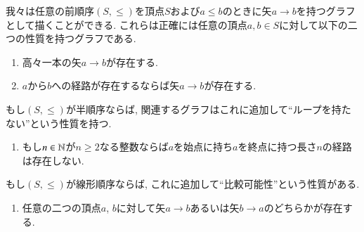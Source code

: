 \begin{remark}\label{rem:preorder to graph}


我々は任意の前順序$(S,\leq)$を頂点$S$および$a\leq b$のときに矢$a\to b$を持つグラフとして描くことができる. これらは正確には任意の頂点$a,b\in S$に対して以下の二つの性質を持つグラフである.
\begin{enumerate}[\hsp 1.]
\item 高々一本の矢$a\to b$が存在する.
\item $a$から$b$への経路が存在するならば矢$a\to b$が存在する.
\end{enumerate}
もし$(S,\leq)$が半順序ならば, 関連するグラフはこれに追加して``ループを持たない''という性質を持つ.
\begin{enumerate}[\hsp 3.]
\item もし$n\in{\mathbb N}$が$n\geq 2$なる整数ならば$a$を始点に持ち$a$を終点に持つ長さ$n$の経路は存在しない.
\end{enumerate}
もし$(S,\leq)$が線形順序ならば, これに追加して``比較可能性''という性質がある.
\begin{enumerate}[\hsp 4.]
\item 任意の二つの頂点$a$, $b$に対して矢$a\to b$あるいは矢$b\to a$のどちらかが存在する.
\end{enumerate}


\end{remark}
